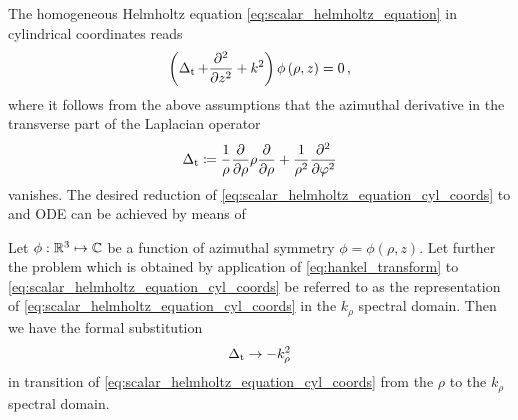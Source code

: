 The homogeneous Helmholtz equation \eqref{eq:scalar_helmholtz_equation} in
cylindrical coordinates reads
\begin{equation}\label{eq:scalar_helmholtz_equation_cyl_coords}
	\left( \operatorname{\operatorname{\Delta}_\mathrm{t}} + \frac{\partial^2}{\partial z^2} + k^2 \right)
	\phi \left(\rho, z\right) = 0
	\, ,
\end{equation}
where it follows from the above assumptions that the azimuthal derivative in
the transverse part of the Laplacian operator
\begin{equation}\label{eq:def_laplace_trans}
	\operatorname{\operatorname{\Delta}_\mathrm{t}} \coloneqq
	\frac{1}{\rho}
	\frac{\partial}{\partial \rho}
	\rho
	\frac{\partial}{\partial \rho}
	+
	\frac{1}{\rho^2}
	\frac{\partial^2}{\partial \varphi^2}
\end{equation}
vanishes. 
The desired reduction of \eqref{eq:scalar_helmholtz_equation_cyl_coords} to
and \ac{ODE} can be achieved by means of
\begin{corollary}\label{coll:k_rho_domain}
	Let $\phi: \mathbb{R}^3 \mapsto \mathbb{C}$ be a function of azimuthal symmetry
	$\phi = \phi \left(\rho, z\right)$.
	Let further the problem which is obtained by application of
	\eqref{eq:hankel_transform} to
	\eqref{eq:scalar_helmholtz_equation_cyl_coords} be referred to as the
	representation of \eqref{eq:scalar_helmholtz_equation_cyl_coords}
	in the $k_\rho$ spectral domain.
	Then we have the formal substitution 
	\begin{equation}\label{eq:k_rho_domain_laplaceTrans_replacement}
		\operatorname{\operatorname{\Delta}_\mathrm{t}} \to -k_\rho^2
	\end{equation}
	in transition of \eqref{eq:scalar_helmholtz_equation_cyl_coords} from the
	$\rho$ to the $k_\rho$ spectral domain.
\end{corollary}
